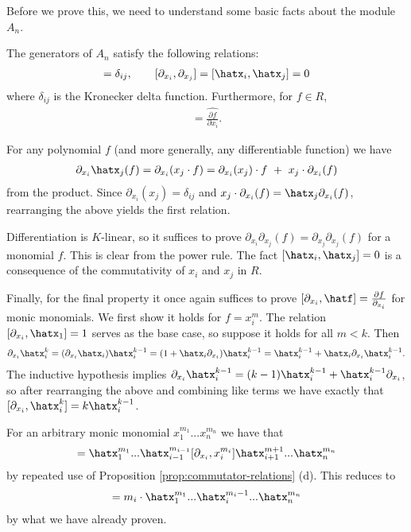 \noindent Before we prove this, we need to understand some basic facts about the module $A_n$.

\begin{lem}\label{lem:Weyl-algebra-relations}
	The generators of $A_n$ satisfy the following relations:
	\begin{align*}
		[\partial_{x_i},\hatx_j] = \delta_{ij}, \hspace{2em} [\partial_{x_i}, \partial_{x_j}] = [\hatx_i,\hatx_j] = 0
	\end{align*}
	where $\delta_{ij}$ is the Kronecker delta function. Furthermore, for $f \in R$,
	\begin{align*}
		[\partial_{x_i}, \hatf] = \widehat{\frac{\partial f}{\partial x_i}}.
	\end{align*}
\end{lem}
\begin{prf}
	For any polynomial $f$ (and more generally, any differentiable function) we have
	\begin{align*}
		\partial_{x_i}\hatx_j(f) = \partial_{x_i}(x_j\cdot f) = \partial_{x_i}(x_j) \cdot f ~+~ x_j \cdot \partial_{x_i}(f)
	\end{align*}
	from the product. Since $\partial_{x_i}(x_j) = \delta_{ij}$ and $x_j\cdot \partial_{x_i}(f) = \hatx_j\partial_{x_i}(f)$, rearranging the above yields the first relation.

	Differentiation is $K$-linear, so it suffices to prove $\partial_{x_i}\partial_{x_j}(f) = \partial_{x_j}\partial_{x_j}(f)$ for a monomial $f$. This is clear from the power rule. The fact $[\hatx_i,\hatx_j] = 0$ is a consequence of the commutativity of $x_i$ and $x_j$ in $R$.

	Finally, for the final property it once again suffices to prove $[\partial_{x_i},\hatf] = \frac{\partial f}{\partial_{x_i}}$ for monic monomials. We first show it holds for $f = x_i^m$. The relation $[\partial_{x_i}, \hatx_1] = 1$ serves as the base case, so suppose it holds for all $m < k$. Then
	\begin{align*}
		\partial_{x_i}\hatx_i^k = (\partial_{x_i}\hatx_i)\hatx_i^{k-1} = (1+\hatx_i\partial_{x_i})\hatx_i^{k-1} = \hatx_i^{k-1} + \hatx_i\partial_{x_i}\hatx_i^{k-1}.
	\end{align*}
	The inductive hypothesis implies $\partial_{x_i}\hatx_i^{k-1} = (k-1)\hatx_i^{k-1} + \hatx_i^{k-1}\partial_{x_i}$, so after rearranging the above and combining like terms we have exactly that $[\partial_{x_i}, \hatx_i^k] = k\hatx_i^{k-1}$.

	For an arbitrary monic monomial $x_1^{m_1}...x_n^{m_n}$ we have that
	\begin{align*}
		[\partial_{x_i}, \hatx_1^{m_1}...\hatx_n^{m_n}] = \hatx_1^{m_1}...\hatx_{i-1}^{m_{i-1}}[\partial_{x_i}, x_i^{m_i}]\hatx_{i+1}^{m+1}...\hatx_{n}^{m_n}
	\end{align*}
	by repeated use of Proposition \ref{prop:commutator-relations} (d). This reduces to
	\begin{align*}
		[\partial_{x_i}, \hatx_1^{m_1}...\hatx_n^{m_n}] = m_i\cdot \hatx_{1}^{m_1}...\hatx_i^{m_i - 1}...\hatx_n^{m_n}
	\end{align*}
	by what we have already proven. 
\end{prf}
